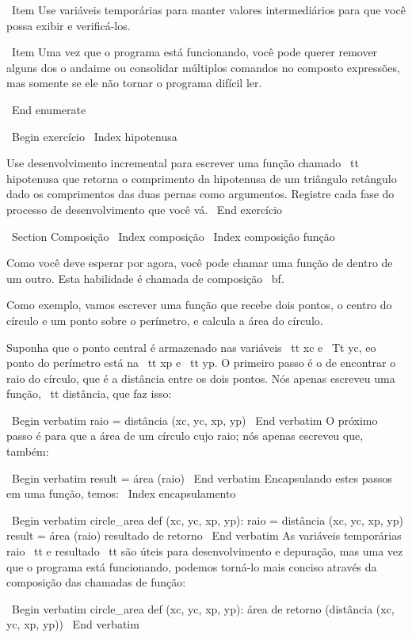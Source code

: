 \documentclass[10pt]{book}
\begin{document}
{{{{\ Item Use variáveis ​​temporárias para manter valores intermediários para que você possa
exibir e verificá-los.

\ Item Uma vez que o programa está funcionando, você pode querer remover alguns dos
o andaime ou consolidar múltiplos comandos no composto
expressões, mas somente se ele não tornar o programa difícil
ler.

\ End {enumerate}

\ Begin {} exercício
\ Index {hipotenusa}

Use desenvolvimento incremental para escrever uma função
chamado {\ tt hipotenusa} que retorna o comprimento da hipotenusa de um
triângulo retângulo dado os comprimentos das duas pernas como argumentos.
Registre cada fase do processo de desenvolvimento que você vá.
\ End {} exercício


\ Section {Composição}
\ Index {composição}
\ Index {composição função}

Como você deve esperar por agora, você pode chamar uma função de
dentro de um outro. Esta habilidade é chamada de composição {\ bf}.

Como exemplo, vamos escrever uma função que recebe dois pontos,
o centro do círculo e um ponto sobre o perímetro, e calcula
a área do círculo.

Suponha que o ponto central é armazenado nas variáveis ​​{\ tt xc} e
{\ Tt yc}, eo ponto do perímetro está na {\ tt xp} e {\ tt yp}. O
primeiro passo é o de encontrar o raio do círculo, que é a distância
entre os dois pontos. Nós apenas escreveu uma função, {\ tt
distância}, que faz isso:

\ Begin {verbatim}
raio = distância (xc, yc, xp, yp)
\ End {verbatim}
%
O próximo passo é para que a área de um círculo cujo raio;
nós apenas escreveu que, também:

\ Begin {verbatim}
result = área (raio)
\ End {verbatim}
%
Encapsulando estes passos em uma função, temos:
\ Index {} encapsulamento

\ Begin {verbatim}
circle_area def (xc, yc, xp, yp):
    raio = distância (xc, yc, xp, yp)
    result = área (raio)
    resultado de retorno
\ End {verbatim}
%
As variáveis ​​temporárias raio {\ tt} e {resultado \ tt} são úteis para
desenvolvimento e depuração, mas uma vez que o programa está funcionando, podemos
torná-lo mais conciso através da composição das chamadas de função:

\ Begin {verbatim}
circle_area def (xc, yc, xp, yp):
    área de retorno (distância (xc, yc, xp, yp))
\ End {verbatim}
%

}}}}
\end{document}
